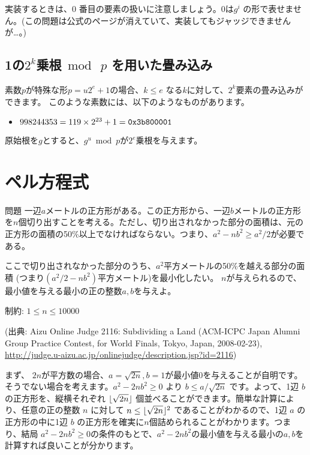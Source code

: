 \documentclass{jsarticle}
\begin{document}
  実装するときは、$0$ 番目の要素の扱いに注意しましょう。$0$は$g^i$ の形で表せません。(この問題は公式のページが消えていて、実装してもジャッジできませんが…。)
  \subsection{1の$2^k$乗根$\bmod\ p$ を用いた畳み込み}
  \label{subsec:mod-convolution}
  素数$p$が特殊な形$p = u2^e + 1$の場合、$k \le e$ なる$k$に対して、$2^k$要素の畳み込みができます。
  このような素数には、以下のようなものがあります。
  \begin{itemize}
   \item $998244353 = 119 \times 2^{23} + 1 = \verb+0x3b800001+$
  \end{itemize}

  原始根を$g$とすると、$g^u \bmod p$が$2^e$乗根を与えます。

 \section{ペル方程式}
 \label{sec:pells-equation}
 \begin{itembox}[l]{問題}
  一辺$a$メートルの正方形がある。この正方形から、一辺$b$メートルの正方形を$n$個切り出すことを考える。ただし、切り出されなかった部分の面積は、元の正方形の面積の50\%以上でなければならない。つまり、$a^2-nb^2 \ge a^2/2$が必要である。

  ここで切り出されなかった部分のうち、$a^2$平方メートルの50\%を越える部分の面積
  (つまり$(a^2/2-nb^2)$平方メートル)を最小化したい。
  $n$が与えられるので、最小値を与える最小の正の整数$a,b$を与えよ。

  制約: $1 \le n \le 10000$

  (出典: Aizu Online Judge 2116: Subdividing a Land (ACM-ICPC Japan Alumni Group Practice Contest, for World Finals, Tokyo, Japan, 2008-02-23),
  \url{http://judge.u-aizu.ac.jp/onlinejudge/description.jsp?id=2116})
 \end{itembox}
 まず、 $2n$が平方数の場合、$a = \sqrt{2n},b=1$が最小値0を与えることが自明です。
 そうでない場合を考えます。$a^2 -2nb^2 \ge 0$ より $b \le a / \sqrt{2n}$ です。よって、1辺 $b$ の正方形を、縦横それぞれ $\lfloor{\sqrt{2n}}\rfloor$ 個並べることができます。簡単な計算により、任意の正の整数 $n$ に対して $n \le \lfloor{\sqrt{2n}}\rfloor^2$ であることがわかるので、1辺 $a$ の正方形の中に1辺 $b$ の正方形を確実に$n$個詰められることがわかります。つまり、結局 $a^2 - 2nb^2 \ge 0$の条件のもとで、$a^2 - 2nb^2$の最小値を与える最小の$a,b$を計算すれば良いことが分かります。
\end{document}
